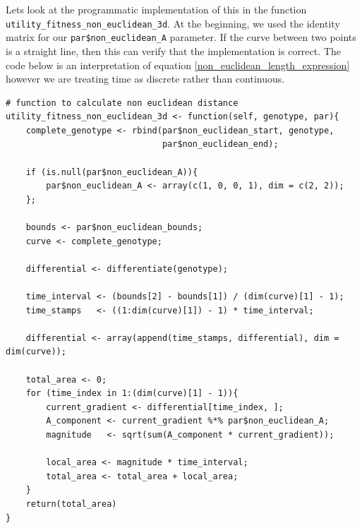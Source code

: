 \documentclass[12pt]{article}
\begin{document}
	Lets look at the programmatic implementation of this in the function \break \texttt{utility\_fitness\_non\_euclidean\_3d}. At the beginning, we used the identity matrix for our \texttt{par\$non\_euclidean\_A} parameter. If the curve between two points is a straight line, then this can verify that the implementation is correct. The code below is an interpretation of equation \ref{non_euclidean_length_expression} however we are treating time as discrete rather than continuous. \break
	
	\begin{lstlisting}
# function to calculate non euclidean distance
utility_fitness_non_euclidean_3d <- function(self, genotype, par){ 
	complete_genotype <- rbind(par$non_euclidean_start, genotype, 
							   par$non_euclidean_end);
	
	if (is.null(par$non_euclidean_A)){
		par$non_euclidean_A <- array(c(1, 0, 0, 1), dim = c(2, 2));
	};
	
	bounds <- par$non_euclidean_bounds;
	curve <- complete_genotype;
	
	differential <- differentiate(genotype);
	
	time_interval <- (bounds[2] - bounds[1]) / (dim(curve)[1] - 1);
	time_stamps   <- ((1:dim(curve)[1]) - 1) * time_interval;
	
	differential <- array(append(time_stamps, differential), dim = dim(curve));
	
	total_area <- 0;
	for (time_index in 1:(dim(curve)[1] - 1)){
		current_gradient <- differential[time_index, ];
		A_component <- current_gradient %*% par$non_euclidean_A;
		magnitude   <- sqrt(sum(A_component * current_gradient));
		
		local_area <- magnitude * time_interval;
		total_area <- total_area + local_area;
	}
	return(total_area)
}
	\end{lstlisting}
	
\end{document}
